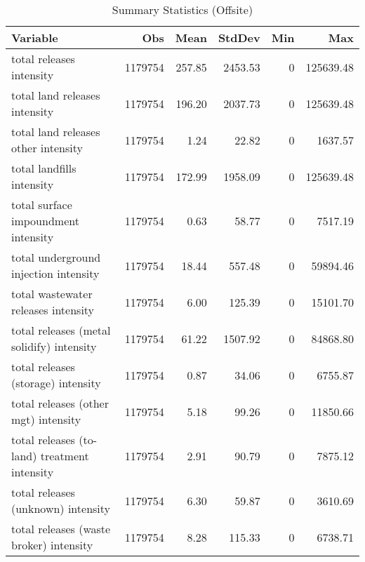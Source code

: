 \begin{table}[H]
    \centering
    \caption{Summary Statistics (Offsite)}
    \label{tab:sumstat-offsite}
    \begin{tabular}{lrrrrr}
        \toprule \toprule
        Variable                                     & Obs     & Mean   & StdDev  & Min & Max       \\ \midrule
        total releases intensity                     & 1179754 & 257.85 & 2453.53 & 0   & 125639.48 \\
        total land releases intensity                & 1179754 & 196.20 & 2037.73 & 0   & 125639.48 \\
        total land releases other intensity          & 1179754 & 1.24   & 22.82   & 0   & 1637.57   \\
        total landfills intensity                    & 1179754 & 172.99 & 1958.09 & 0   & 125639.48 \\
        total surface impoundment intensity          & 1179754 & 0.63   & 58.77   & 0   & 7517.19   \\
        total underground injection intensity        & 1179754 & 18.44  & 557.48  & 0   & 59894.46  \\
        total wastewater releases intensity          & 1179754 & 6.00   & 125.39  & 0   & 15101.70  \\
        total releases (metal solidify) intensity    & 1179754 & 61.22  & 1507.92 & 0   & 84868.80  \\
        total releases (storage) intensity           & 1179754 & 0.87   & 34.06   & 0   & 6755.87   \\
        total releases (other mgt) intensity         & 1179754 & 5.18   & 99.26   & 0   & 11850.66  \\
        total releases (to-land) treatment intensity & 1179754 & 2.91   & 90.79   & 0   & 7875.12   \\
        total releases (unknown) intensity           & 1179754 & 6.30   & 59.87   & 0   & 3610.69   \\
        total releases (waste broker) intensity      & 1179754 & 8.28   & 115.33  & 0   & 6738.71   \\ \bottomrule\bottomrule
    \end{tabular}
\end{table}
